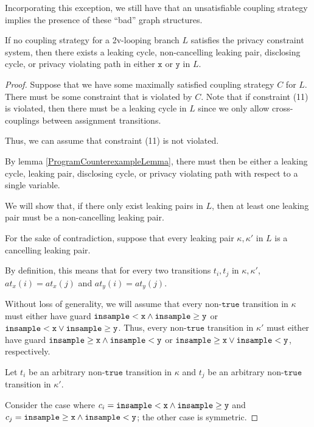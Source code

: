 Incorporating this exception, we still have that an unsatisfiable coupling strategy implies the presence of these ``bad'' graph structures. 

\begin{lemma}
    If no coupling strategy for a 2v-looping branch $L$ satisfies the privacy constraint system, then there exists a leaking cycle, non-cancelling leaking pair, disclosing cycle, or privacy violating path in either $\texttt{x}$ or $\texttt{y}$ in $L$.
\end{lemma}
\begin{proof}
    Suppose that we have some maximally satisfied coupling strategy $C$ for $L$. There must be some constraint that is violated by $C$. Note that if constraint (11) is violated, then there must be a leaking cycle in $L$ since we only allow cross-couplings between assignment transitions. 

    Thus, we can assume that constraint (11) is not violated. 

    By lemma \ref{ProgramCounterexampleLemma}, there must then be either a leaking cycle, leaking pair, disclosing cycle, or privacy violating path with respect to a single variable. 

    We will show that, if there only exist leaking pairs in $L$, then at least one leaking pair must be a non-cancelling leaking pair. 

    For the sake of contradiction, suppose that every leaking pair $\kappa, \kappa'$ in $L$ is a cancelling leaking pair. 

    By definition, this means that for every two transitions $t_i, t_j$ in $\kappa, \kappa'$, $at_x(i) = at_x(j)$ and $at_y(i) = at_y(j)$.

    Without loss of generality, we will assume that every non-$\texttt{true}$ transition in $\kappa$ must either have guard $\lguard[\texttt{x}]\land\gguard[\texttt{y}]$ or $\lguard[\texttt{x}]\lor\gguard[\texttt{y}]$. Thus, every non-$\texttt{true}$ transition in $\kappa'$ must either have guard $\gguard[\texttt{x}]\land\lguard[\texttt{y}]$ or $\gguard[\texttt{x}]\lor\lguard[\texttt{y}]$, respectively. 

    Let $t_i$ be an arbitrary non-$\texttt{true}$ transition in $\kappa$ and $t_j$ be an arbitrary non-$\texttt{true}$ transition in $\kappa'$.

    Consider the case where $c_i = \lguard[\texttt{x}]\land\gguard[\texttt{y}]$ and $c_j = \gguard[\texttt{x}]\land\lguard[\texttt{y}]$; the other case is symmetric.


\end{proof}
